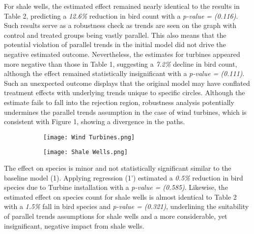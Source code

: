 \documentclass{article}
\begin{document}
\addlinespace

For shale wells, the estimated effect remained nearly identical to the results in Table 2, predicting a \textit{12.6\%} reduction in bird count with a \textit{p-value = (0.116)}. Such results serve as a robustness check as trends are seen on the graph with control and treated groups being vastly parallel. This also means that the potential violation of parallel trends in the initial model did not drive the negative estimated outcome. Nevertheless, the estimates for turbines appeared more negative than those in Table 1, suggesting a \textit{7.2\%} decline in bird count, although the effect remained statistically insignificant with a \textit{p-value = (0.111)}. Such an unexpected outcome displays that the original model may have conflated treatment effects with underlying trends unique to specific circles. Although the estimate fails to fall into the rejection region, robustness analysis potentially undermines the parallel trends assumption in the case of wind turbines, which is consistent with Figure 1, showing a divergence in the paths.

\begin{center}
\end{center}

\begin{figure}[H]
    \centering
    \begin{subfigure}[t]{0.49\textwidth}
        \centering
        \texttt{[image: Wind Turbines.png]}
    \end{subfigure}
    \hspace{0pt} %
    \begin{subfigure}[t]{0.49\textwidth}
        \centering
        \texttt{[image: Shale Wells.png]}
    \end{subfigure}
\end{figure}

\addlinespace

The effect on species is minor and not statistically significant similar to the baseline model (1). Applying regression (1') estimated a \textit{0.5\%} reduction in bird species due to Turbine installation with a \textit{p-value = (0.585)}. Likewise, the estimated effect on species count for shale wells is almost identical to Table 2 with a \textit{1.5\%} fall in bird species and \textit{p-value = (0.321)}, underlining the suitability of parallel trends assumptions for shale wells and a more considerable, yet insignificant, negative impact from shale wells.
\end{document}
